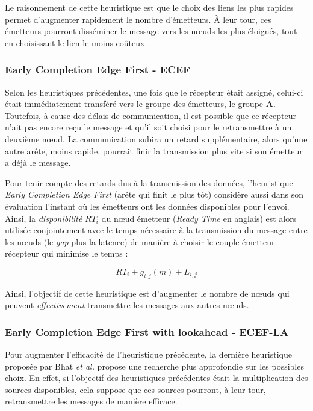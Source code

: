 Le raisonnement de cette heuristique est que le choix des liens les
plus rapides permet d'augmenter rapidement le nombre d'émetteurs.
À leur tour, ces émetteurs pourront disséminer le message vers les
n{\oe}uds les plus éloignés, tout en choisissant le lien le moins
coûteux.


\subsubsection*{Early Completion Edge First - ECEF}

Selon les heuristiques précédentes, une fois que le récepteur était
assigné, celui-ci était immédiatement transféré vers le groupe des
émetteurs, le groupe \textbf{A}. Toutefois, à cause des délais de
communication, il est possible que ce récepteur n'ait pas encore reçu
le message et qu'il soit choisi pour le retransmettre à un deuxième
n{\oe}ud. La communication subira un retard supplémentaire, alors
qu'une autre arête, moins rapide, pourrait finir la transmission plus
vite si son émetteur a déjà le message. 

Pour tenir compte des retards dus à la transmission des données, l'heuristique
\emph{Early Completion Edge First} (arête qui finit le plus tôt) considère
aussi dans son évaluation l'instant où les émetteurs ont les données
disponibles pour l'envoi. Ainsi, la \emph{disponibilité} $RT_{i}$
du n{\oe}ud émetteur (\emph{Ready Time} en anglais) est alors utilisée
conjointement avec le temps nécessaire à la transmission du message
entre les n{\oe}uds (le \textit{gap} plus la latence) de manière à choisir
le couple émetteur-récepteur qui minimise le temps : 

\[
RT_{i}+g_{i,j}(m)+L_{i,j}\]


Ainsi, l'objectif de cette heuristique est d'augmenter le nombre de
n{\oe}uds qui peuvent \emph{effectivement} transmettre les messages
aux autres n{\oe}uds.


\subsubsection*{Early Completion Edge First with lookahead - ECEF-LA}

Pour augmenter l'efficacité de l'heuristique précédente, la dernière
heuristique proposée par Bhat \emph{et al.} \cite{Bhat03} propose
une recherche plus approfondie sur les possibles choix. En effet,
si l'objectif des heuristiques précédentes était la multiplication
des sources disponibles, cela suppose que ces sources pourront, à
leur tour, retransmettre les messages de manière efficace.


